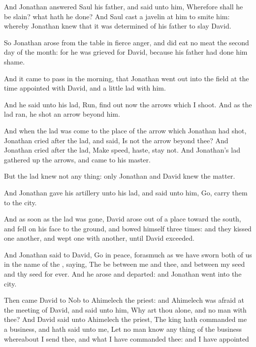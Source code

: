 \Verse And Jonathan answered Saul his father, and said unto him, Wherefore shall he be slain? what hath he done?  \Verse And Saul cast a javelin at him to smite him: whereby Jonathan knew that it was determined of his father to slay David.

\Verse So Jonathan arose from the table in fierce anger, and did eat no meat the second day of the month: for he was grieved for David, because his father had done him shame.

\Verse And it came to pass in the morning, that Jonathan went out into the field at the time appointed with David, and a little lad with him.

\Verse And he said unto his lad, Run, find out now the arrows which I shoot. And as the lad ran, he shot an arrow beyond him.

\Verse And when the lad was come to the place of the arrow which Jonathan had shot, Jonathan cried after the lad, and said, Is not the arrow beyond thee?  \Verse And Jonathan cried after the lad, Make speed, haste, stay not. And Jonathan's lad gathered up the arrows, and came to his master.

\Verse But the lad knew not any thing: only Jonathan and David knew the matter.

\Verse And Jonathan gave his artillery unto his lad, and said unto him, Go, carry them to the city.

\Verse And as soon as the lad was gone, David arose out of a place toward the south, and fell on his face to the ground, and bowed himself three times: and they kissed one another, and wept one with another, until David exceeded.

\Verse And Jonathan said to David, Go in peace, forasmuch as we have sworn both of us in the name of the \LORD, saying, The \LORD be between me and thee, and between my seed and thy seed for ever. And he arose and departed: and Jonathan went into the city.


\Chapter
\Verse Then came David to Nob to Ahimelech the priest: and Ahimelech was afraid at the meeting of David, and said unto him, Why art thou alone, and no man with thee?  \Verse And David said unto Ahimelech the priest, The king hath commanded me a business, and hath said unto me, Let no man know any thing of the business whereabout I send thee, and what I have commanded thee: and I have appointed my servants to such and such a place.

\Verse Now therefore what is under thine hand? give me five loaves of bread in mine hand, or what there is present.

